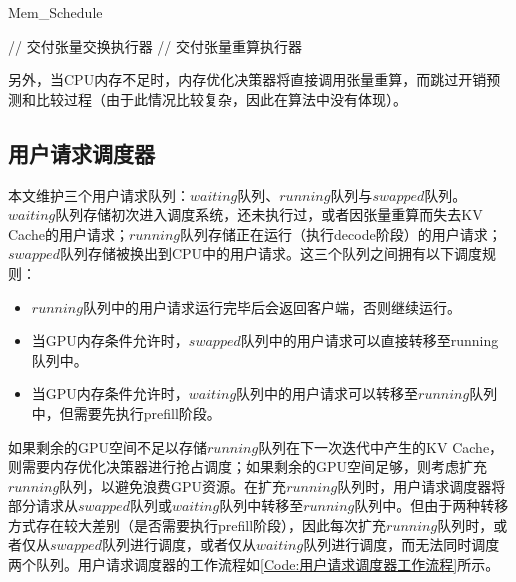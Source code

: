 \begin{algorithm}
  \caption{Mem\_Schedule}
  \label{Code:内存优化决策器工作流程}
  \small
  \begin{spacing}{1.2}
    \begin{algorithmic}[1]
           \hfill {// 交付张量交换执行器}
        \ELSE
           \hfill {// 交付张量重算执行器}
        \ENDIF
      \ENDWHILE
    \end{algorithmic}
  \end{spacing}
\end{algorithm}

另外，当CPU内存不足时，内存优化决策器将直接调用张量重算，而跳过开销预测和比较过程（由于此情况比较复杂，因此在算法中没有体现）。

\subsection{用户请求调度器}

本文维护三个用户请求队列：$waiting$队列、$running$队列与$swapped$队列。$waiting$队列存储初次进入调度系统，还未执行过，或者因张量重算而失去KV Cache的用户请求；$running$队列存储正在运行（执行decode阶段）的用户请求；$swapped$队列存储被换出到CPU中的用户请求。这三个队列之间拥有以下调度规则：

\begin{itemize}
  \item $running$队列中的用户请求运行完毕后会返回客户端，否则继续运行。
  \item 当GPU内存条件允许时，$swapped$队列中的用户请求可以直接转移至running队列中。
  \item 当GPU内存条件允许时，$waiting$队列中的用户请求可以转移至$running$队列中，但需要先执行prefill阶段。
\end{itemize}

如果剩余的GPU空间不足以存储$running$队列在下一次迭代中产生的KV Cache，则需要内存优化决策器进行抢占调度；如果剩余的GPU空间足够，则考虑扩充$running$队列，以避免浪费GPU资源。在扩充$running$队列时，用户请求调度器将部分请求从$swapped$队列或$waiting$队列中转移至$running$队列中。但由于两种转移方式存在较大差别（是否需要执行prefill阶段），因此每次扩充$running$队列时，或者仅从$swapped$队列进行调度，或者仅从$waiting$队列进行调度，而无法同时调度两个队列。用户请求调度器的工作流程如\ref{Code:用户请求调度器工作流程}所示。

